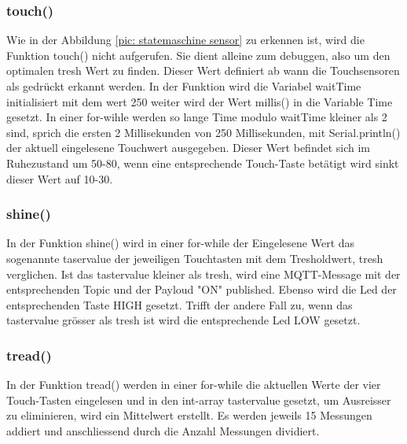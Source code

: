 \subsubsection{touch()} 
Wie in der Abbildung \ref{pic: statemaschine sensor} zu erkennen ist, wird die Funktion touch() nicht aufgerufen. Sie dient alleine zum debuggen, also um den optimalen tresh Wert zu finden. Dieser Wert definiert ab wann die Touchsensoren als gedrückt erkannt werden. In der Funktion wird die Variabel waitTime initialisiert mit dem wert 250 weiter wird der Wert millis() in die Variable Time gesetzt. In einer for-wihle werden so lange Time modulo waitTime kleiner als 2 sind, sprich die ersten 2 Millisekunden von 250 Millisekunden, mit Serial.println() der aktuell eingelesene Touchwert ausgegeben. Dieser Wert befindet sich im Ruhezustand um 50-80, wenn eine entsprechende Touch-Taste betätigt wird sinkt dieser Wert auf 10-30.  
\subsubsection{shine()}
In der Funktion shine() wird in einer for-while der Eingelesene Wert das sogenannte taservalue der jeweiligen Touchtasten mit dem Tresholdwert, tresh verglichen. Ist das tastervalue kleiner als tresh, wird eine MQTT-Message mit der entsprechenden Topic und der Payloud "ON" published. Ebenso wird die Led der entsprechenden Taste HIGH gesetzt. Trifft der andere Fall zu, wenn das tastervalue grösser als tresh ist wird die entsprechende Led LOW gesetzt.
\subsubsection{tread()}
In der Funktion tread() werden in einer for-while die aktuellen Werte der vier Touch-Tasten eingelesen und in den int-array tastervalue gesetzt, um Ausreisser zu eliminieren, wird ein Mittelwert erstellt. Es werden jeweils 15 Messungen addiert und anschliessend durch die Anzahl Messungen dividiert.  
